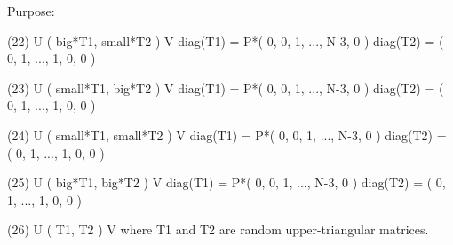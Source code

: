 \begin{DoxyParagraph}{Purpose\+: }
\begin{DoxyVerb}
 (22) U ( big*T1, small*T2 ) V   diag(T1) = P*( 0, 0, 1, ..., N-3, 0 )
                                 diag(T2) = ( 0, 1, ..., 1, 0, 0 )

 (23) U ( small*T1, big*T2 ) V   diag(T1) = P*( 0, 0, 1, ..., N-3, 0 )
                                 diag(T2) = ( 0, 1, ..., 1, 0, 0 )

 (24) U ( small*T1, small*T2 ) V diag(T1) = P*( 0, 0, 1, ..., N-3, 0 )
                                 diag(T2) = ( 0, 1, ..., 1, 0, 0 )

 (25) U ( big*T1, big*T2 ) V     diag(T1) = P*( 0, 0, 1, ..., N-3, 0 )
                                 diag(T2) = ( 0, 1, ..., 1, 0, 0 )

 (26) U ( T1, T2 ) V     where T1 and T2 are random upper-triangular
                         matrices.\end{DoxyVerb}
 
\end{DoxyParagraph}

